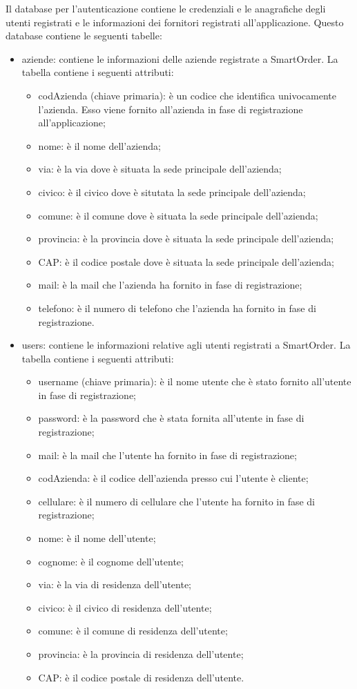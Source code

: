\documentclass[12pt, a4paper, titlepage]{report}
\begin{document}
	Il database per l'autenticazione contiene le credenziali e le anagrafiche degli utenti registrati e le informazioni dei fornitori registrati all'applicazione. Questo database contiene le seguenti tabelle:
	\begin{itemize}
		\item aziende: contiene le informazioni delle aziende registrate a SmartOrder. La tabella contiene i seguenti attributi:
		\begin{itemize}
			\item codAzienda (chiave primaria): è un codice che identifica univocamente l'azienda. Esso viene fornito all'azienda in fase di registrazione all'applicazione;
			\item nome: è il nome dell'azienda;
			\item via: è la via dove è situata la sede principale dell'azienda;
			\item civico: è il civico dove è situtata la sede principale dell'azienda;
			\item comune: è il comune dove è situata la sede principale dell'azienda;
			\item provincia: è la provincia dove è situata la sede principale dell'azienda;
			\item CAP: è il codice postale dove è situata la sede principale dell'azienda;
			\item mail: è la mail che l'azienda ha fornito in fase di registrazione;
			\item telefono: è il numero di telefono che l'azienda ha fornito in fase di registrazione.
		\end{itemize}
		\item users: contiene le informazioni relative agli utenti registrati a SmartOrder. La tabella contiene i seguenti attributi:
		\begin{itemize}
			\item username (chiave primaria): è il nome utente che è stato fornito all'utente in fase di registrazione;
			\item password: è la password che è stata fornita all'utente in fase di registrazione;
			\item mail: è la mail che l'utente ha fornito in fase di registrazione;
			\item codAzienda: è il codice dell'azienda presso cui l'utente è cliente;
			\item cellulare: è il numero di cellulare che l'utente ha fornito in fase di registrazione;
			\item nome: è il nome dell'utente;
			\item cognome: è il cognome dell'utente;
			\item via: è la via di residenza dell'utente;
			\item civico: è il civico di residenza dell'utente;
			\item comune: è il comune di residenza dell'utente;
			\item provincia: è la provincia di residenza dell'utente;
			\item CAP: è il codice postale di residenza dell'utente.
		\end{itemize}
	\end{itemize}
	
\end{document}
